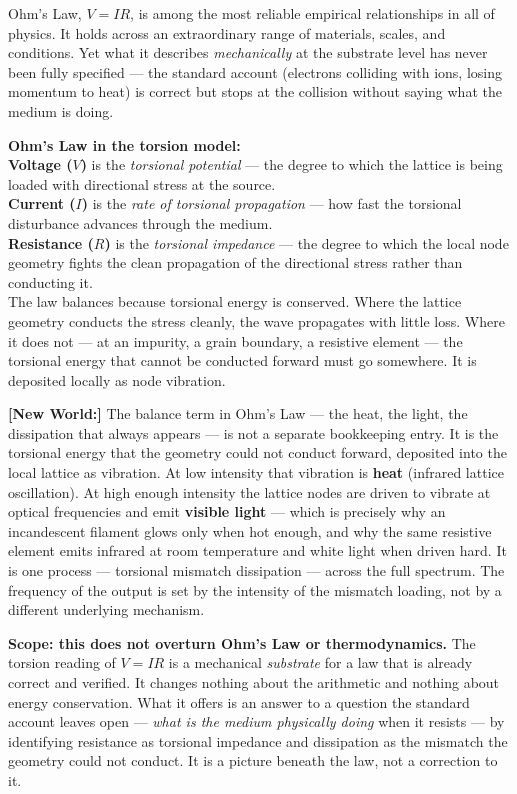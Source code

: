 \documentclass[11pt, letterpaper, openany]{book}
\newcommand{\newworldcmd}[1]{\noindent\textbf{\color{kishblue}[New World:]}
  #1\medskip}
\begin{document}
Ohm's Law, $V = IR$, is among the most reliable empirical relationships in
all of physics. It holds across an extraordinary range of materials,
scales, and conditions. Yet what it describes \emph{mechanically} at the
substrate level has never been fully specified --- the standard account
(electrons colliding with ions, losing momentum to heat) is correct but
stops at the collision without saying what the medium is doing.
 
\begin{theorybox}
\textbf{Ohm's Law in the torsion model:}\\[0.5em]
\textbf{Voltage ($V$)} is the \emph{torsional potential} --- the degree to
which the lattice is being loaded with directional stress at the source.\\[0.4em]
\textbf{Current ($I$)} is the \emph{rate of torsional propagation} --- how
fast the torsional disturbance advances through the medium.\\[0.4em]
\textbf{Resistance ($R$)} is the \emph{torsional impedance} --- the degree
to which the local node geometry fights the clean propagation of the
directional stress rather than conducting it.\\[0.5em]
The law balances because torsional energy is conserved. Where the lattice
geometry conducts the stress cleanly, the wave propagates with little loss.
Where it does not --- at an impurity, a grain boundary, a resistive element
--- the torsional energy that cannot be conducted forward must go somewhere.
It is deposited locally as node vibration.
\end{theorybox}
 
\newworldcmd{The balance term in Ohm's Law --- the heat, the light, the
dissipation that always appears --- is not a separate bookkeeping entry.
It is the torsional energy that the geometry could not conduct forward,
deposited into the local lattice as vibration. At low intensity that
vibration is \textbf{heat} (infrared lattice oscillation). At high enough
intensity the lattice nodes are driven to vibrate at optical frequencies
and emit \textbf{visible light} --- which is precisely why an incandescent
filament glows only when hot enough, and why the same resistive element
emits infrared at room temperature and white light when driven hard. It is
one process --- torsional mismatch dissipation --- across the full
spectrum. The frequency of the output is set by the intensity of the
mismatch loading, not by a different underlying mechanism.}
 
\begin{warningbox}
\textbf{Scope: this does not overturn Ohm's Law or thermodynamics.} The
torsion reading of $V = IR$ is a mechanical \emph{substrate} for a law that
is already correct and verified. It changes nothing about the arithmetic
and nothing about energy conservation. What it offers is an answer to a
question the standard account leaves open --- \emph{what is the medium
physically doing} when it resists --- by identifying resistance as
torsional impedance and dissipation as the mismatch the geometry could not
conduct. It is a picture beneath the law, not a correction to it.
\end{warningbox}
 
\end{document}
